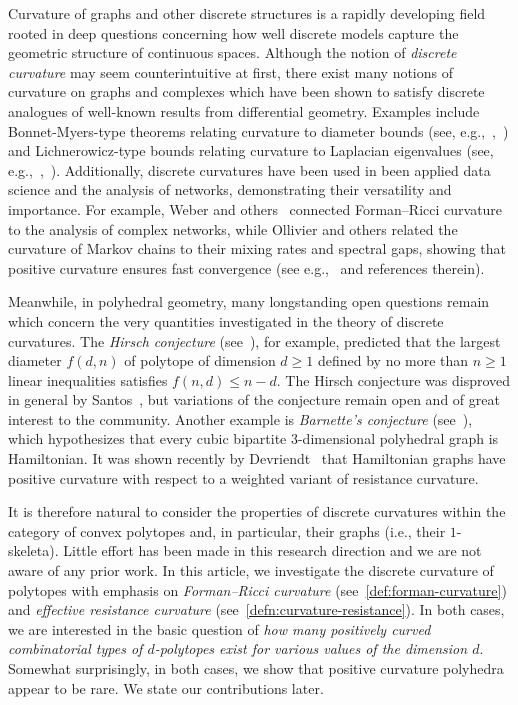 \documentclass[11pt,a4paper]{amsart}
\begin{document}
Curvature of graphs and other discrete structures is a rapidly developing field rooted in deep questions concerning how well discrete models capture the geometric structure of continuous spaces. Although the notion of \emph{discrete curvature} may seem counterintuitive at first, there exist many notions of curvature on graphs and complexes which have been shown to satisfy discrete analogues of well-known results from differential geometry. Examples include Bonnet-Myers-type theorems relating curvature to diameter bounds (see, e.g.,~\cite[Thm. 1]{devriendt2024graph},~\cite[Thm. 6.3]{forman}) and Lichnerowicz-type bounds relating curvature to Laplacian eigenvalues (see, e.g.,~\cite[Thm. 4.2]{lin2011ricci},~\cite[Thm. 3]{steinerberger2023curvature}).
Additionally, discrete curvatures have been used in been applied data science and the analysis of networks, demonstrating their versatility and importance.
For example, Weber and others~\cite{Weber2017,Fesseretal2024} connected Forman--Ricci curvature to the analysis of complex networks, while Ollivier and others related the curvature of Markov chains to their mixing rates and spectral gaps, showing that positive curvature ensures fast convergence (see e.g.,~\cite{Ollivier2009,munch2022mixingtimeexpansionnonnegatively} and references therein). 

Meanwhile, in polyhedral geometry, many longstanding open questions remain which concern the very quantities investigated in the theory of discrete curvatures. The \emph{Hirsch conjecture} (see~\cite{Ziegler}), for example, predicted that the largest diameter $f(d,n)$ of polytope of dimension $d\geq 1$ defined by no more than $n\ge 1$ linear inequalities satisfies $f(n,d)\le n-d$. The Hirsch conjecture was disproved in general by Santos~\cite{santos2012counterexample}, but variations of the conjecture remain open and of great interest to the community. Another example is \emph{Barnette's conjecture} (see~\cite{Barnette1969Conjecture5}), which hypothesizes that every cubic bipartite 3-dimensional polyhedral graph is Hamiltonian. It was shown recently by Devriendt~\cite{devriendt2025graphs} that Hamiltonian graphs have positive curvature with respect to a weighted variant of resistance curvature.

It is therefore natural to consider the properties of discrete curvatures within the category of convex polytopes and, in particular, their graphs (i.e., their $1$-skeleta). Little effort has been made in this research direction and we are not aware of any prior work. In this article, we investigate the discrete curvature of polytopes with emphasis on \emph{Forman--Ricci curvature} (see~\cref{def:forman-curvature}) and \emph{effective resistance curvature} (see~\cref{defn:curvature-resistance}). In both cases, we are interested in the basic question of \emph{how many positively curved combinatorial types of $d$-polytopes exist for various values of the dimension $d$}. Somewhat surprisingly, in both cases, we show that positive curvature polyhedra appear to be rare. We state our contributions later. 
\end{document}
